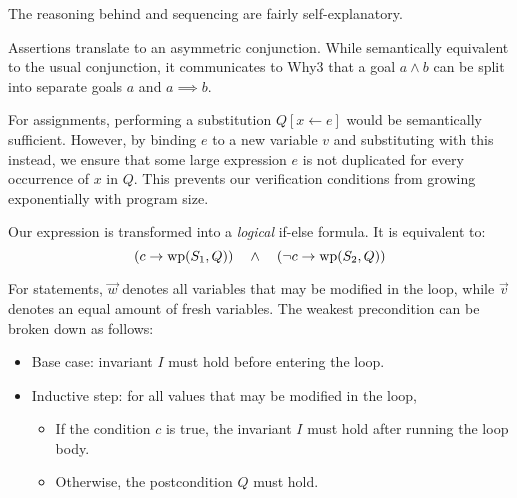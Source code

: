 The reasoning behind  and sequencing are fairly self-explanatory.

Assertions translate to an asymmetric conjunction.
While semantically equivalent to the usual conjunction, it communicates to Why3
that a goal $a \land b$ can be split into separate goals $a$ and $a \implies b$.

For assignments, performing a substitution $Q[x \leftarrow e]$ would be semantically sufficient.
However, by binding $e$ to a new variable $v$ and substituting with this instead,
we ensure that some large expression $e$ is not duplicated for every occurrence of $x$ in $Q$.
This prevents our verification conditions from growing exponentially with program size.

Our  expression is transformed into a \textit{logical} if-else formula.
It is equivalent to:
\[
    (c  \rightarrow \mathrm{wp}(S_1, Q)) ~~~\land~~~
    (\neg c  \rightarrow \mathrm{wp}(S_2, Q))
\]

For  statements,
$\overset{\rightarrow} w$ denotes all variables that may be modified in the loop,
while $\overset{\rightarrow} v$ denotes an equal amount of fresh variables.
The weakest precondition can be broken down as follows:
\begin{itemize}
    \item Base case: invariant $I$ must hold before entering the loop.
    \item Inductive step: for all values that may be modified in the loop,
    \begin{itemize}
        \item If the condition $c$ is true, the invariant $I$ must hold after running the loop body.
        \item Otherwise, the postcondition $Q$ must hold.
    \end{itemize}
\end{itemize}

